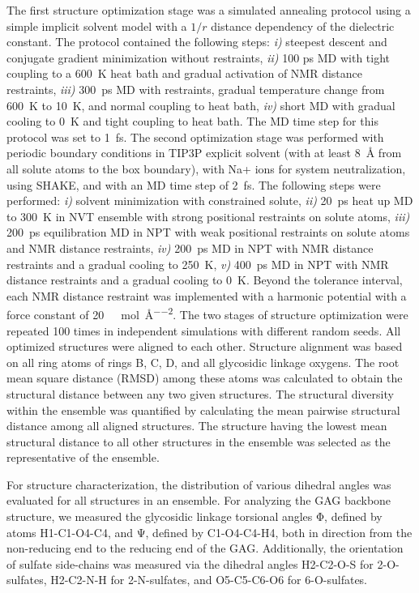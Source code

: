 The first structure optimization stage was a simulated annealing protocol using
a simple implicit solvent model with a $1/r$ distance dependency of the
dielectric constant. The protocol contained the following steps: \textit{i)}
steepest descent and conjugate gradient minimization without restraints,
\textit{ii)} 100 ps MD with tight coupling to a \SI{600}{\kelvin} heat bath and
gradual activation of NMR distance restraints, \textit{iii)}
\SI{300}{\pico\second} MD with restraints, gradual temperature change from
\SI{600}{\kelvin} to \SI{10}{\kelvin}, and normal coupling to heat bath,
\textit{iv)} short MD with gradual cooling to \SI{0}{\kelvin} and tight coupling
to heat bath. The MD time step for this protocol was set to
\SI{1}{\femto\second}. The second optimization stage was performed with periodic
boundary conditions in TIP3P explicit solvent (with at least \SI{8}{\angstrom}
from all solute atoms to the box boundary), with Na+ ions for system
neutralization, using SHAKE, and with an MD time step of \SI{2}{\femto\second}.
The following steps were performed: \textit{i)} solvent minimization with
constrained solute, \textit{ii)} \SI{20}{\pico\second} heat up MD to
\SI{300}{\kelvin} in NVT ensemble with strong positional restraints on solute
atoms, \textit{iii)} \SI{200}{\pico\second} equilibration MD in NPT with weak
positional restraints on solute atoms and NMR distance restraints, \textit{iv)}
\SI{200}{\pico\second} MD in NPT with NMR distance restraints and a gradual
cooling to \SI{250}{\kelvin}, \textit{v)} \SI{400}{\pico\second} MD in NPT with
NMR distance restraints and a gradual cooling to \SI{0}{\kelvin}. Beyond the
tolerance interval, each NMR distance restraint was implemented with a harmonic
potential with a force constant of
\SI{20}{\kilo\calory\per\mole\per\angstrom\squared}. The two stages of structure
optimization were repeated 100 times in independent simulations with different
random seeds. All optimized structures were aligned to each other. Structure
alignment was based on all ring atoms of rings B, C, D, and all glycosidic
linkage oxygens. The root mean square distance (RMSD) among these atoms was
calculated to obtain the structural distance between any two given structures.
The structural diversity within the ensemble was quantified by calculating the
mean pairwise structural distance among all aligned structures. The structure
having the lowest mean structural distance to all other structures in the
ensemble was selected as the representative of the ensemble.

For structure characterization, the distribution of various dihedral angles was
evaluated for all structures in an ensemble. For analyzing the GAG backbone
structure, we measured the glycosidic linkage torsional angles Φ, defined by
atoms H1-C1-O4-C4, and Ψ, defined by C1-O4-C4-H4, both in direction from the
non-reducing end to the reducing end of the GAG. Additionally, the orientation
of sulfate side-chains was measured via the dihedral angles H2-C2-O-S for
2-O-sulfates, H2-C2-N-H for 2-N-sulfates, and O5-C5-C6-O6 for 6-O-sulfates.

